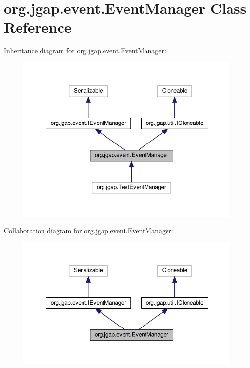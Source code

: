 \hypertarget{classorg_1_1jgap_1_1event_1_1_event_manager}{\section{org.\-jgap.\-event.\-Event\-Manager Class Reference}
\label{classorg_1_1jgap_1_1event_1_1_event_manager}
}


Inheritance diagram for org.\-jgap.\-event.\-Event\-Manager\-:
\nopagebreak
\begin{figure}[H]
\begin{center}
\leavevmode
\includegraphics[width=350pt]{classorg_1_1jgap_1_1event_1_1_event_manager__inherit__graph}
\end{center}
\end{figure}


Collaboration diagram for org.\-jgap.\-event.\-Event\-Manager\-:
\nopagebreak
\begin{figure}[H]
\begin{center}
\leavevmode
\includegraphics[width=350pt]{classorg_1_1jgap_1_1event_1_1_event_manager__coll__graph}
\end{center}
\end{figure}
